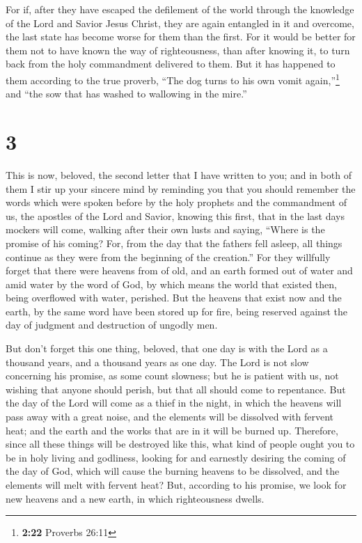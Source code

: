  For if, after they have escaped the defilement of the
world through the knowledge of the Lord and Savior Jesus Christ, they
are again entangled in it and overcome, the last state has become worse
for them than the first.  For it would be better for them
not to have known the way of righteousness, than after knowing it, to
turn back from the holy commandment delivered to them. 
But it has happened to them according to the true proverb, ``The dog
turns to his own vomit again,''\footnote{\textbf{2:22} Proverbs 26:11}
and ``the sow that has washed to wallowing in the mire.''

\hypertarget{section-2}{%
\section{3}\label{section-2}}

 This is now, beloved, the second letter that I have
written to you; and in both of them I stir up your sincere mind by
reminding you  that you should remember the words which
were spoken before by the holy prophets and the commandment of us, the
apostles of the Lord and Savior,  knowing this first, that
in the last days mockers will come, walking after their own lusts
 and saying, ``Where is the promise of his coming? For,
from the day that the fathers fell asleep, all things continue as they
were from the beginning of the creation.''  For they
willfully forget that there were heavens from of old, and an earth
formed out of water and amid water by the word of God,  by
which means the world that existed then, being overflowed with water,
perished.  But the heavens that exist now and the earth,
by the same word have been stored up for fire, being reserved against
the day of judgment and destruction of ungodly men.

 But don't forget this one thing, beloved, that one day is
with the Lord as a thousand years, and a thousand years as one day.
 The Lord is not slow concerning his promise, as some
count slowness; but he is patient with us, not wishing that anyone
should perish, but that all should come to repentance. 
But the day of the Lord will come as a thief in the night, in which the
heavens will pass away with a great noise, and the elements will be
dissolved with fervent heat; and the earth and the works that are in it
will be burned up.  Therefore, since all these things
will be destroyed like this, what kind of people ought you to be in holy
living and godliness,  looking for and earnestly desiring
the coming of the day of God, which will cause the burning heavens to be
dissolved, and the elements will melt with fervent heat? 
But, according to his promise, we look for new heavens and a new earth,
in which righteousness dwells.

